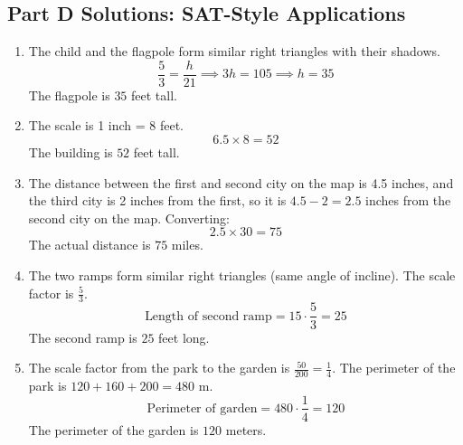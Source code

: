\documentclass[14pt]{extarticle}
\begin{document}
\subsection*{Part D Solutions: SAT-Style Applications}
\begin{enumerate}
  \item The child and the flagpole form similar right triangles with their shadows.
  \[
  \frac{5}{3} = \frac{h}{21} \implies 3h = 105 \implies h = 35
  \]
  The flagpole is \(\boxed{35}\) feet tall.

  \item The scale is 1 inch = 8 feet.
  \[
  6.5 \times 8 = 52
  \]
  The building is \(\boxed{52}\) feet tall.

  \item The distance between the first and second city on the map is 4.5 inches, and the third city is 2 inches from the first, so it is \(4.5 - 2 = 2.5\) inches from the second city on the map. Converting:
  \[
  2.5 \times 30 = 75
  \]
  The actual distance is \(\boxed{75}\) miles.

  \item The two ramps form similar right triangles (same angle of incline). The scale factor is \(\frac{5}{3}\).
  \[
  \text{Length of second ramp} = 15 \cdot \frac{5}{3} = 25
  \]
  The second ramp is \(\boxed{25}\) feet long.

  \item The scale factor from the park to the garden is \(\frac{50}{200} = \frac{1}{4}\). The perimeter of the park is \(120 + 160 + 200 = 480\) m.
  \[
  \text{Perimeter of garden} = 480 \cdot \frac{1}{4} = 120
  \]
  The perimeter of the garden is \(\boxed{120}\) meters.
\end{enumerate}
\end{document}
